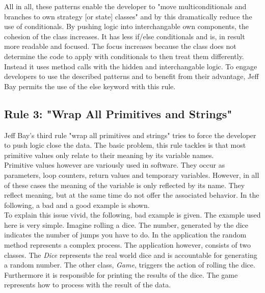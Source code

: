  All in all, these patterns enable the developer to "move multiconditionals and branches to own strategy [or state] classes" \cite[p. 350]{gof} and by this dramatically reduce the use of conditionals. By pushing logic into interchangable own components, the cohesion of the class increases. It has less if/else conditionals and is, in result more readable and focused. The focus increases because the class does not determine the code to apply with conditionals to then treat them differently. Instead it uses method calls with the hidden and interchangable logic. To engage developers to use the described patterns and to benefit from their advantage, Jeff Bay permits the use of the else keyword with this rule. 

\subsection*{Rule 3: "Wrap All Primitives and Strings"}
Jeff Bay's third rule "wrap all primitives and strings" tries to force the developer to push logic close the data. The basic problem, this rule tackles is that most primitive values only relate to their meaning by its variable names. 
\\

Primitive values however are variously used in software. They occur as parameters, loop counters, return values and temporary variables. However, in all of these cases the meaning of the variable is only reflected by its name. They reflect meaning, but at the same time do not offer the associated behavior. In the following, a bad and a good example is shown. 
\\

To explain this issue vivid, the following, bad example is given. The example used here is very simple. Imagine rolling a dice. The number, generated by the dice indicates the number of jumps you have to do. In the application the random method represents a complex process. The application however, consists of two classes. The \textit{Dice} represents the real world dice and is accountable for generating a random number. The other class, \textit{Game}, triggers the action of rolling the dice. Furthermore it is responsible for printing the results of the dice. The game represents how to process with the result of the data.   
\\

